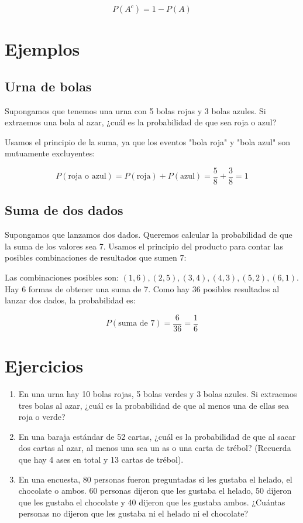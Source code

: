 \documentclass[letterpaper,12pt]{article}
\begin{document}
	\[
	P(A^c) = 1 - P(A)
	\]
	
	\section{Ejemplos}
	
	\subsection{Urna de bolas}
	Supongamos que tenemos una urna con 5 bolas rojas y 3 bolas azules. Si extraemos una bola al azar, ¿cuál es la probabilidad de que sea roja o azul?
	
	Usamos el principio de la suma, ya que los eventos "bola roja" y "bola azul" son mutuamente excluyentes:
	
	\[
	P(\text{roja o azul}) = P(\text{roja}) + P(\text{azul}) = \frac{5}{8} + \frac{3}{8} = 1
	\]
	
	\subsection{Suma de dos dados}
	Supongamos que lanzamos dos dados. Queremos calcular la probabilidad de que la suma de los valores sea 7. Usamos el principio del producto para contar las posibles combinaciones de resultados que sumen 7:
	
	Las combinaciones posibles son: $(1,6), (2,5), (3,4), (4,3), (5,2), (6,1)$. Hay 6 formas de obtener una suma de 7. Como hay 36 posibles resultados al lanzar dos dados, la probabilidad es:
	
	\[
	P(\text{suma de 7}) = \frac{6}{36} = \frac{1}{6}
	\]
	
	\section{Ejercicios}
	
	\begin{enumerate}
		\item En una urna hay 10 bolas rojas, 5 bolas verdes y 3 bolas azules. Si extraemos tres bolas al azar, ¿cuál es la probabilidad de que al menos una de ellas sea roja o verde?
		\item En una baraja estándar de 52 cartas, ¿cuál es la probabilidad de que al sacar dos cartas al azar, al menos una sea un as o una carta de trébol? (Recuerda que hay 4 ases en total y 13 cartas de trébol).
		\item En una encuesta, 80 personas fueron preguntadas si les gustaba el helado, el chocolate o ambos. 60 personas dijeron que les gustaba el helado, 50 dijeron que les gustaba el chocolate y 40 dijeron que les gustaba ambos. ¿Cuántas personas no dijeron que les gustaba ni el helado ni el chocolate?
	\end{enumerate}
	
\end{document}
